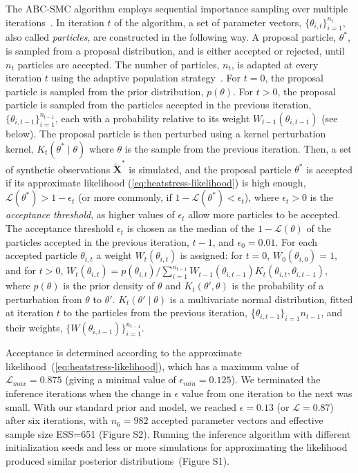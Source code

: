 \documentclass[12pt]{article}
\let\vec\mathbf
\newcommand{\likelihood}{\mathcal{L}}
\begin{document}
The ABC-SMC algorithm employs sequential importance sampling over multiple iterations~\citep{Toni2009, Klinger2017, Syga2021}.
In iteration $t$ of the algorithm, a set of parameter vectors, $\{\theta_{i,t}\}_{i=1}^{n_t}$, also called \emph{particles}, are constructed in the following way.
A proposal particle, $\theta^*$, is sampled from a proposal distribution, and is either accepted or rejected, until $n_t$ particles are accepted.
The number of particles, $n_t$, is adapted at every iteration $t$ using the adaptive population strategy~\citep[\href{https://pyabc.readthedocs.io}{pyabc.readthedocs.io}]{Klinger2018}.
For $t=0$, the proposal particle is sampled from the prior distribution, $p(\theta)$.
For $t>0$, the proposal particle is sampled from the particles accepted in the previous iteration, $\{\theta_{i,t-1}\}_{i=1}^{n_{t-1}}$, each with a probability relative to its weight $W_{t-1}(\theta_{i,t-1})$ (see below). The proposal particle is then perturbed using a kernel perturbation kernel, $K_t(\theta^* \mid \theta)$ where $\theta$ is the sample from the previous iteration.
Then, a set of synthetic observations $\tilde{\vec X}^*$ is simulated, and the proposal particle $\theta^*$ is accepted if its approximate likelihood (\cref{eq:heatstress-likelihood}) is high enough, $\likelihood(\theta^*)>1-\epsilon_t$ (or more commonly, if $1-\likelihood(\theta^*) < \epsilon_t$), where $\epsilon_t>0$ is the \emph{acceptance threshold}, as higher values of $\epsilon_t$ allow more particles to be accepted. 
The acceptance threshold $\epsilon_t$ is chosen as the median of the $1-\likelihood(\theta)$ of the particles accepted in the previous iteration, $t-1$, and $\epsilon_0=0.01$. 
For each accepted particle $\theta_{i,t}$ a weight $W_t(\theta_{i,t})$ is assigned: for $t=0$, $W_0(\theta_{i,0})=1$, and for $t>0$, 
$W_t(\theta_{i,t}) = p(\theta_{i,t}) / \sum_{i=1}^{n_{t-1}}{W_{t-1}(\theta_{i,t-1}) K_t(\theta_{i,t}, \theta_{i,t-1})}$, where $p(\theta)$ is the prior density of $\theta$ and $K_t(\theta', \theta)$ is the probability of a perturbation from $\theta$ to $\theta'$.
$K_t(\theta' \mid \theta)$ is a multivariate normal distribution, fitted at iteration $t$ to the particles from the previous iteration, \{$\theta_{i,t-1}\}_{i=1}{n_{t-1}}$, and their weights, $\{W(\theta_{i,t-1})\}_{i=1}^{n_{t-1}}$.

Acceptance is determined according to the approximate likelihood~(\cref{eq:heatstress-likelihood}), which has a maximum value of $\likelihood_{max}=0.875$ (giving a minimal value of $\epsilon_{min}=0.125$). We terminated the inference iterations when the change in $\epsilon$ value from one iteration to the next was small.
With our standard prior and model, we reached $\epsilon=0.13$ (or $\likelihood=0.87$) after six iterations, with $n_6=982$ accepted parameter vectors and effective sample size ESS=651 (Figure S2). Running the inference algorithm with different initialization seeds and less or more simulations for approximating the likelihood produced similar posterior distributions~(Figure S1). 
\end{document}
